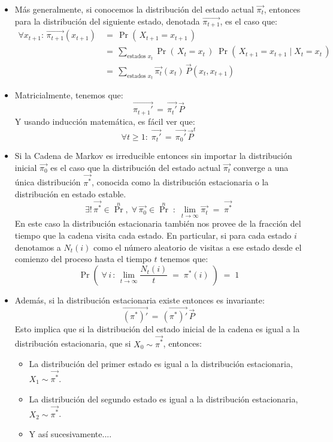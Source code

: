 \documentclass[ 10pt, xcolor = dvipsnames]{beamer}
\begin{document}
\begin{frame}[allowframebreaks]
\begin{itemize}
\item M\'as generalmente, si conocemos la distribuci\'on del estado actual $\vec{\pi_t}$, entonces para la distribuci\'on del siguiente estado, denotada $\vec{\pi_{t+1}}$, \linebreak es el caso que: 
\begin{align*}
\forall x_{t+1} \colon \, \vec{\pi_{t+1}}(x_{t+1}) \, 
& = \, \Pr( \, X_{t+1} = x_{t+1} \, ) \\[1ex]
& = \, \sum_{\text{estados } x_t} \Pr( \, X_t = x_t \, ) \; \Pr( \, X_{t+1} = x_{t+1} \mid X_t = x_t \, ) \\[1ex]
& = \, \sum_{\text{estados } x_t} \vec{\pi_t}(x_t) \, \vec{P}(x_t,x_{t+1})
\end{align*}
\item Matricialmente, tenemos que: 
\[
\vec{\pi_{t+1}'} \, = \, \vec{\pi_t'} \, \vec{P}
\]
Y usando inducci\'on matem\'atica, es f\'acil ver que: 
\[
\forall t \geq 1 \colon \;
\vec{\pi_t'} \, = \, \vec{\pi_0'} \, \vec{P}^t
\]
\end{itemize}
\framebreak

\begin{itemize}
\item Si la Cadena de Markov es irreducible entonces sin importar la distribuci\'on inicial $\vec{\pi_0}$ es el caso que la distribuci\'on del estado actual $\vec{\pi_t}$ converge a una \'unica distribuci\'on $\vec{\pi^*}$, conocida como la distribuci\'on estacionaria o la distribuci\'on en estado estable. \Iec 
\[
\exists! \, \vec{\pi^*} \in \Pr^n, \; \forall \, \vec{\pi_0} \in \Pr^n \; \colon \;
\lim_{ t \rightarrow \infty } \vec{\pi_t} \; = \;
\vec{\pi^*}
\]
En este caso la distribuci\'on estacionaria tambi\'en nos provee de la fracci\'on del tiempo que la cadena visita cada estado. En particular, si para cada estado $i$ denotamos a $N_t(i)$ como el n\'umero aleatorio de visitas a ese estado desde el comienzo del proceso hasta el tiempo $t$ tenemos que: 
\[
\Pr \left( \;
\forall \, i \, \colon \, \lim_{ t \rightarrow \infty } \frac{N_t(i)}{t} \; = \; \pi^*(i) \; \right) \; = \; 1
\]
\end{itemize}
\framebreak

\begin{itemize}
\item Adem\'as, si la distribuci\'on estacionaria existe entonces es invariante: 
\[
\vec{(\pi^*)'} \, = \, \vec{(\pi^*)'} \, \vec{P}
\]
Esto implica que si la distribuci\'on del estado inicial de la cadena es igual a \linebreak la distribuci\'on estacionaria, \ie que si $X_0 \sim \vec{\pi^*}$, entonces:
\begin{itemize}
\item La distribuci\'on del primer estado es igual a la distribuci\'on estacionaria, \ie $X_1 \sim \vec{\pi^*}$. 
\item La distribuci\'on del segundo estado es igual a la distribuci\'on estacionaria, \ie $X_2 \sim \vec{\pi^*}$. 
\item Y as\'i sucesivamente....
\end{itemize}
\end{itemize}


\end{frame}
\end{document}
